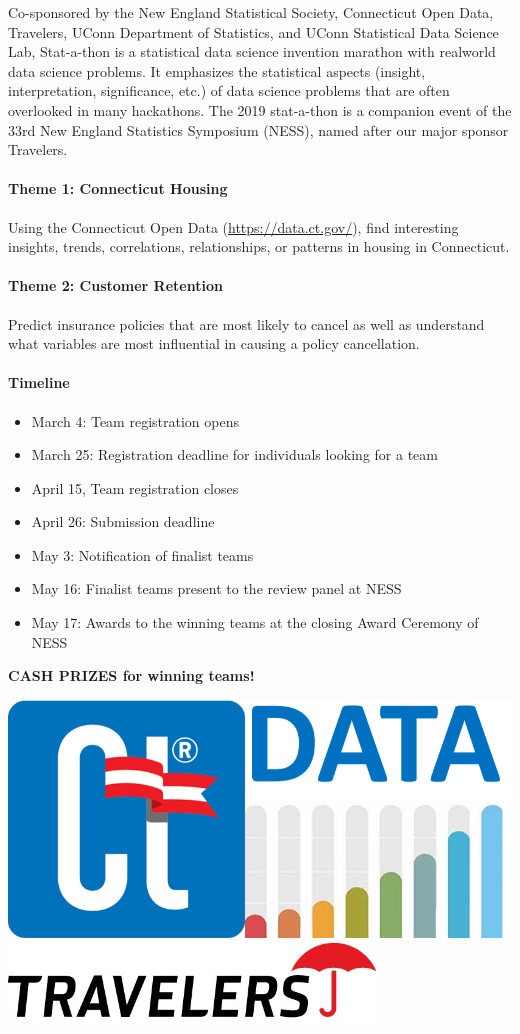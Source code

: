 \documentclass[12pt]{article}
\begin{document}
\begin{large}
Co-sponsored by the New England Statistical Society,
Connecticut Open Data, Travelers,
UConn Department of Statistics, and UConn Statistical Data Science Lab,
Stat-a-thon is a statistical data science invention marathon with
realworld data science problems. It emphasizes the statistical aspects
(insight, interpretation, significance, etc.) of data science problems
that are often overlooked in many hackathons. The 2019 stat-a-thon is a
companion event of the 33rd New England Statistics Symposium (NESS), named
after our major sponsor Travelers.


\paragraph{Theme 1: Connecticut Housing}
Using the Connecticut Open Data (\url{https://data.ct.gov/}), find
interesting insights, trends, correlations, relationships, or patterns
in housing in Connecticut.

\paragraph{Theme 2: Customer Retention}
Predict insurance policies that are most likely to cancel as well as
understand what variables are most influential in causing a policy
cancellation.

\paragraph{Timeline}
\begin{itemize}
\item 
  March 4: Team registration opens
\item
  March 25: Registration deadline for individuals looking for a team
\item 
  April 15, Team registration closes
\item
  April 26: Submission deadline
\item
  May 3: Notification of finalist teams
\item
  May 16: Finalist teams present to the review panel at NESS
\item
  May 17: Awards to the winning teams at the closing Award Ceremony of NESS
\end{itemize}

\end{large}

\vfill 

\begin{center}
  {\bf\Large
    CASH PRIZES for winning teams!
  }
\end{center}


\begin{center}
  \includegraphics[width=0.26\linewidth]{ct-data}
  \hfill
\includegraphics[width=0.73\textwidth]{travelers-logo}
\end{center}
\end{document}
